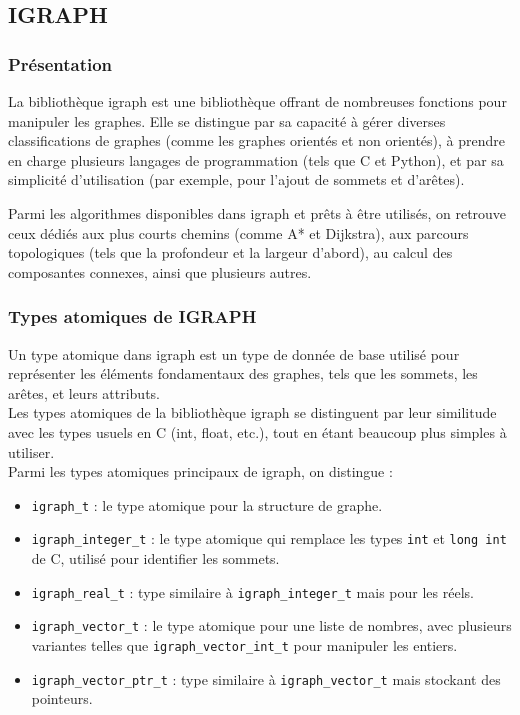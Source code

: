 \subsection{IGRAPH}
\subsubsection{Présentation}

La bibliothèque igraph est une bibliothèque offrant de nombreuses fonctions pour manipuler les graphes. Elle se distingue par sa capacité à gérer diverses classifications de graphes (comme les graphes orientés et non orientés), à prendre en charge plusieurs langages de programmation (tels que C et Python), et par sa simplicité d'utilisation (par exemple, pour l'ajout de sommets et d'arêtes).
 
Parmi les algorithmes disponibles dans igraph et prêts à être utilisés, on retrouve ceux dédiés aux plus courts chemins (comme A* et Dijkstra), aux parcours topologiques (tels que la profondeur et la largeur d'abord), au calcul des composantes connexes, ainsi que plusieurs autres.\\

\subsubsection{Types atomiques de IGRAPH}
Un type atomique dans igraph est un type de donnée de base utilisé pour représenter les éléments fondamentaux des graphes, tels que les sommets, les arêtes, et leurs attributs.\\
Les types atomiques de la bibliothèque igraph se distinguent par leur similitude avec les types usuels en C (int, float, etc.), tout en étant beaucoup plus simples à utiliser.\\
Parmi les types atomiques principaux de igraph, on distingue :

\begin{itemize}
    \item \texttt{igraph\_t} : le type atomique pour la structure de graphe.
    \item \texttt{igraph\_integer\_t} : le type atomique qui remplace les types \texttt{int} et \texttt{long int} de C, utilisé pour identifier les sommets.
    \item \texttt{igraph\_real\_t} : type similaire à \texttt{igraph\_integer\_t} mais pour les réels.
    \item \texttt{igraph\_vector\_t} : le type atomique pour une liste de nombres, avec plusieurs variantes telles que \texttt{igraph\_vector\_int\_t} pour manipuler les entiers.
    \item \texttt{igraph\_vector\_ptr\_t} : type similaire à \texttt{igraph\_vector\_t} mais stockant des pointeurs.
\end{itemize}

